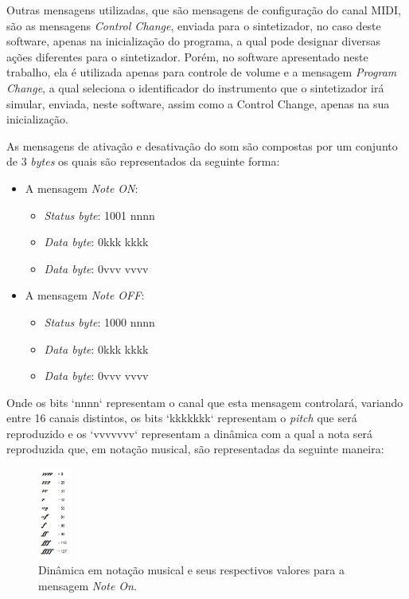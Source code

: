 \documentclass[12pt]{report}
\begin{document}
{Outras mensagens utilizadas, que são mensagens de
configuração do canal MIDI, são as mensagens {\it Control Change},
enviada para o sintetizador, no caso deste software, apenas na
inicialização do programa, a qual pode designar diversas ações
diferentes para o sintetizador. Porém, no software apresentado neste
trabalho, ela é utilizada apenas para controle de volume e a mensagem
{\it Program Change}, a qual seleciona o identificador do instrumento
que o sintetizador irá simular, enviada, neste software, assim como a
Control Change, apenas na sua inicialização.

As mensagens de ativação e desativação do som são compostas por um
conjunto de 3 {\it bytes} os quais são representados da seguinte
forma:
\begin{itemize}
  \item A mensagem {\it Note ON}:
  \begin{itemize}
    \item {\it Status byte}: 1001 nnnn
    \item {\it Data byte}: 0kkk kkkk
    \item {\it Data byte}: 0vvv vvvv
  \end{itemize}
  \item A mensagem {\it Note OFF}:
  \begin{itemize}
    \item {\it Status byte}: 1000 nnnn
    \item {\it Data byte}: 0kkk kkkk
    \item {\it Data byte}: 0vvv vvvv
  \end{itemize}
\end{itemize}

Onde os bits `nnnn` representam o canal que esta mensagem controlará,
variando entre 16 canais distintos, os bits `kkkkkkk` representam o
{\it pitch} que será reproduzido e os `vvvvvvv` representam a dinâmica
com a qual a nota será reproduzida que, em notação musical, são
representadas da seguinte maneira:

\begin{figure}[H]
  \centering
    \includegraphics[width=0.1\textwidth]{imagens/nuance-velocity-table.jpg}
    \caption{Dinâmica em notação musical e seus respectivos valores
      para a mensagem {\it Note On}.}
  \label{fig:Velocidades em notação musical}
\end{figure}

}
\end{document}
